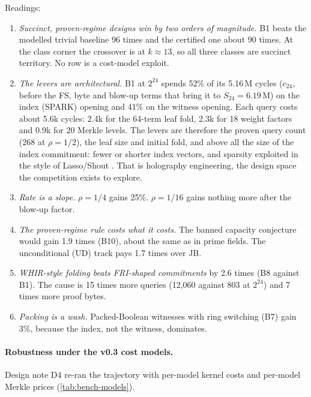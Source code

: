 Readings:
\begin{enumerate}[nosep]
\item \emph{Succinct, proven-regime designs win by two orders of magnitude.} B1 beats the modelled
  trivial baseline 96 times and the certified one about 90 times. At the class corner the crossover is at $k\approx13$, so all three classes are
  succinct territory. No row is a cost-model exploit.
\item \emph{The levers are architectural.} B1 at $2^{24}$ spends 52\% of its 5.16\,M cycles ($c_{24}$, before the FS, byte and
  blow-up terms that bring it to $S_{24}=6.19$\,M) on the index (SPARK) opening and 41\% on the witness opening. Each query costs about 5.6k cycles: 2.4k for
  the 64-term leaf fold, 2.3k for 18 weight factors and 0.9k for 20 Merkle levels. The levers are
  therefore the proven query count (268 at $\rho=1/2$), the leaf size and initial fold, and above all
  the size of the index commitment: fewer or shorter index vectors, and sparsity exploited in the
  style of Lasso/Shout \cite{ST25-TwistShout}. That is holography engineering, the design space the
  competition exists to explore.
\item \emph{Rate is a slope.} $\rho=1/4$ gains 25\%. $\rho=1/16$ gains nothing more after the blow-up
  factor.
\item \emph{The proven-regime rule costs what it costs.} The banned capacity conjecture would gain
  1.9 times (B10), about the same as in prime fields. The unconditional (UD) track pays 1.7 times
  over JB.
\item \emph{WHIR-style folding beats FRI-shaped commitments} by 2.6 times (B8 against B1). The cause is
  15 times more queries (12{,}060 against 803 at $2^{24}$) and 7 times more proof bytes.
\item \emph{Packing is a wash.} Packed-Boolean witnesses with ring switching (B7) gain 3\%, because the
  index, not the witness, dominates.
\end{enumerate}
\paragraph{Robustness under the v0.3 cost models.} Design note D4 re-ran the trajectory with
per-model kernel costs and per-model Merkle prices (\cref{tab:bench-models}).

